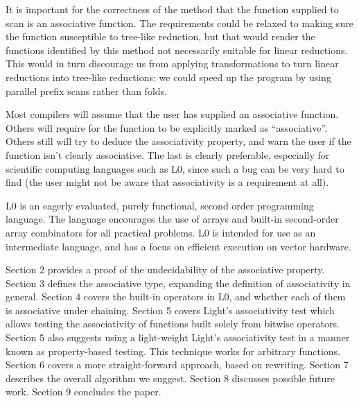 It is important for the correctness of the method that the function supplied to
scan is an associative function. The requirements could be relaxed to making
sure the function susceptible to tree-like reduction, but that would render the
functions identified by this method not necessarily suitable for linear
reductions. This would in turn discourage us from applying transformations to
turn linear reductions into tree-like reductions: we could speed up the program
by using parallel prefix scans rather than folds.

Most compilers will assume that the user has supplied an associative function.
Others will require for the function to be explicitly marked as
``associative''. Others still will try to deduce the associativity property,
and warn the user if the function isn't clearly associative. The last is
clearly preferable, especially for scientific computing languages such as L0,
since such a bug can be very hard to find (the user might not be aware that
associativity is a requirement at all).

L0 is an eagerly evaluated, purely functional, second order programming
language. The language encourages the use of arrays and built-in second-order
array combinators for all practical problems. L0 is intended for use as an
intermediate language, and has a focus on efficient execution on vector
hardware.

Section 2 provides a proof of the undecidability of the associative property.
Section 3 defines the associative type, expanding the definition of
associativity in general. Section 4 covers the built-in operators in L0, and
whether each of them is associative under chaining. Section 5 covers Light's
associativity test which allows testing the associativity of functions built
solely from bitwise operators. Section 5 also suggests using a light-weight
Light's associativity test in a manner known as property-based testing. This
technique works for arbitrary functions. Section 6 covers a more
straight-forward approach, based on rewriting. Section 7 describes the overall
algorithm we suggest. Section 8 discusses possible future work. Section 9
concludes the paper.

